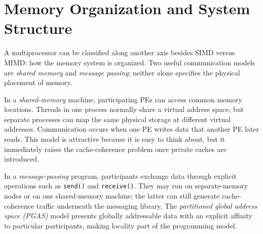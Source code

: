 \section{Memory Organization and System Structure}\label{sec:mp-memory-organization}
A multiprocessor can be classified along another axis besides SIMD versus MIMD: how the memory system is organized.
Two useful communication models are \textit{shared memory} and \textit{message passing}; neither alone specifies the physical placement of memory.

In a \textit{shared-memory} machine, participating PEs can access common memory locations.
Threads in one process normally share a virtual address space, but separate processes can map the same physical storage at different virtual addresses.
Communication occurs when one PE writes data that another PE later reads.
This model is attractive because it is easy to think about, but it immediately raises the cache-coherence problem once private caches are introduced.

In a \textit{message-passing} program, participants exchange data through explicit operations such as \texttt{send()} and \texttt{receive()}.
They may run on separate-memory nodes or on one shared-memory machine; the latter can still generate cache-coherence traffic underneath the messaging library.
The \textit{partitioned global address space (PGAS)} model presents globally addressable data with an explicit affinity to particular participants, making locality part of the programming model.

